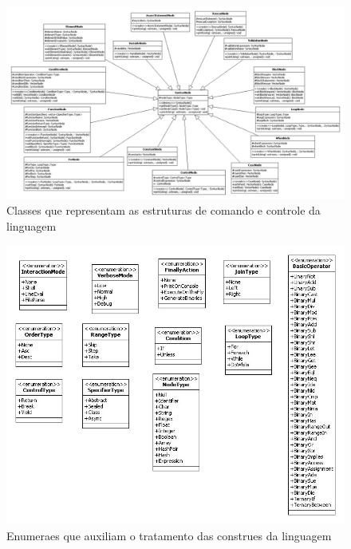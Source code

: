 \begin{figure}[!htp]
  \begin{center}
    \includegraphics[width=1\textwidth]{figuras/classes5}
  \end{center}
  \caption{Classes que representam as estruturas de comando e controle da linguagem}
  \label{fig:classes5}
\end{figure}

\begin{figure}[!htp]
  \begin{center}
    \includegraphics[width=1\textwidth]{figuras/classes6}
  \end{center}
  \caption{Enumera\co es que auxiliam o tratamento das constru\co es da linguagem}
  \label{fig:classes6}
\end{figure}
